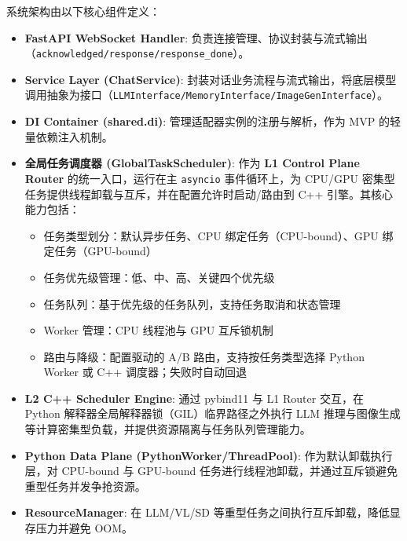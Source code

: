 \documentclass[a4paper,12pt]{article}
\begin{document}
系统架构由以下核心组件定义：

\begin{itemize}
    \item \textbf{FastAPI WebSocket Handler}: 负责连接管理、协议封装与流式输出（\texttt{acknowledged/response/response\_done}）。
    \item \textbf{Service Layer (ChatService)}: 封装对话业务流程与流式输出，将底层模型调用抽象为接口（\texttt{LLMInterface/MemoryInterface/ImageGenInterface}）。
    \item \textbf{DI Container (shared.di)}: 管理适配器实例的注册与解析，作为 MVP 的轻量依赖注入机制。
    \item \textbf{全局任务调度器 (GlobalTaskScheduler)}: 作为 \textbf{L1 Control Plane Router} 的统一入口，运行在主 \texttt{asyncio} 事件循环上，为 CPU/GPU 密集型任务提供线程卸载与互斥，并在配置允许时启动/路由到 C++ 引擎。其核心能力包括：
    \begin{itemize}
        \item 任务类型划分：默认异步任务、CPU 绑定任务（CPU-bound）、GPU 绑定任务（GPU-bound）
        \item 任务优先级管理：低、中、高、关键四个优先级
        \item 任务队列：基于优先级的任务队列，支持任务取消和状态管理
        \item Worker 管理：CPU 线程池与 GPU 互斥锁机制
        \item 路由与降级：配置驱动的 A/B 路由，支持按任务类型选择 Python Worker 或 C++ 调度器；失败时自动回退
    \end{itemize}
    \item \textbf{L2 C++ Scheduler Engine}: 通过 pybind11 与 L1 Router 交互，在 Python 解释器全局解释器锁（GIL）临界路径之外执行 LLM 推理与图像生成等计算密集型负载，并提供资源隔离与任务队列管理能力。
    \item \textbf{Python Data Plane (PythonWorker/ThreadPool)}: 作为默认卸载执行层，对 CPU-bound 与 GPU-bound 任务进行线程池卸载，并通过互斥锁避免重型任务并发争抢资源。
    \item \textbf{ResourceManager}: 在 LLM/VL/SD 等重型任务之间执行互斥卸载，降低显存压力并避免 OOM。
\end{itemize}
\end{document}
